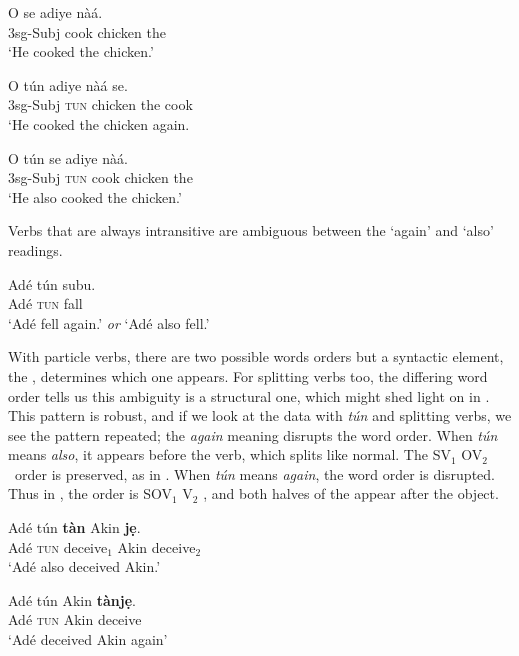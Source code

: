 \documentclass[output=paper]{LSP/langsci}
\begin{document}
\ea 
 \ea 
   \gll O se adiye n\`{a}\'{a}. \\
   3sg-Subj cook chicken the \\
   \glt `He cooked the chicken.'
   \label{ex:parrish:reg}
   
   \ex 
   \gll O t\'{u}n adiye n\`{a}\'{a} se. \\
   3sg-Subj {\textsc{tun}} chicken the cook \\
   \glt `He cooked the chicken again.
   \label{ex:parrish:again}
   

   
   \ex 
   \gll O t\'{u}n se adiye n\`{a}\'{a}. \\
   3sg-Subj {\textsc{tun}} cook chicken the \\
   \glt `He also cooked the chicken.'
   \label{ex:parrish:also}
 \z 
\z


Verbs that are always intransitive are ambiguous between the `again' and `also' readings.

\ea 
   \gll Ad\'{e} t\'{u}n subu. \\
   Ad\'{e} {\textsc{tun}} fall \\
   \glt `Ad\'{e} fell again.' \textit{or} `Ad\'{e} also fell.'
   \label{ex:parrish:intransitive}
\z

With  particle verbs, there are two possible words orders but a syntactic element, the , determines which one appears. For splitting verbs too, the differing word order tells us this ambiguity is a structural one, which might shed light on  in . This pattern is robust, and if we look at the data with \textit{t\'{u}n} and splitting verbs, we see the pattern repeated; the \textit{again} meaning disrupts the word order. When \textit{t\'{u}n} means \textit{also}, it appears before the verb, which splits like normal. The SV$_{1}$ OV$_{2}$\ order is preserved, as in . When \textit{t\'{u}n} means \textit{again}, the word order is disrupted. Thus in , the order is SOV$_{1}$ V$_{2}$ , and both halves of the  appear after the object.


\ea 
 \ea 
   \gll Ad\'{e} t\'{u}n \textbf{t\`{a}n} Akin \textbf{j\d{e}}. \\
   Ad\'{e} {\textsc{tun}} {deceive$_{1}$} Akin {deceive$_{2}$} \\
   \glt `Ad\'{e} also deceived Akin.'
   \label{ex:parrish:tun-Bill-je}
   
  \ex 
   \gll Ad\'{e} t\'{u}n Akin \textbf{t\`{a}nj\d{e}}. \\
   Ad\'{e} {\textsc{tun}} Akin deceive \\
   \glt `Ad\'{e} deceived Akin again'
   \label{ex:parrish:Bill-tanje}
 \z 
\z
\end{document}
